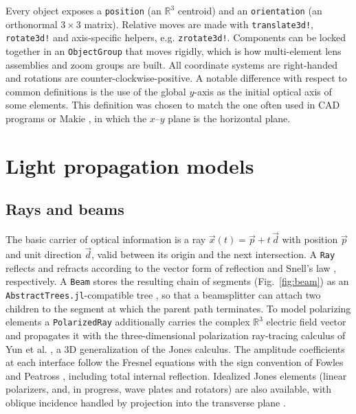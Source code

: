 \documentclass{juliacon}
\begin{document}
Every object exposes a \texttt{position} (an $\mathbb{R}^3$ centroid)
and an \texttt{orientation} (an orthonormal $3\times3$ matrix). Relative
moves are made with \texttt{translate3d!}, \texttt{rotate3d!} and 
axis-specific helpers, e.g. \texttt{zrotate3d!}. Components can be
locked together in an \texttt{ObjectGroup} that moves rigidly, which is
how multi-element lens assemblies and zoom groups are built. All
coordinate systems are right-handed and rotations are
counter-clockwise-positive. A notable difference with respect to common
definitions is the use of the global $y$-axis as the initial optical
axis of some elements. This definition was chosen to match the one often
used in CAD programs or Makie \cite{Danisch2021}, in which the $x$--$y$
plane is the horizontal plane.

\section{Light propagation models}

\subsection{Rays and beams}
\label{sec:rays}

The basic carrier of optical information is a ray
$\vec{x}(t) = \vec{p} + t\,\vec{d}$ with position $\vec{p}$ and unit
direction $\vec{d}$, valid between its origin and the next intersection.
A \texttt{Ray} reflects and refracts according to the vector form of
reflection and Snell's law \cite{Spencer1962}, respectively. A
\texttt{Beam} stores the resulting chain of segments
(Fig.~\ref{fig:beam}) as an \texttt{AbstractTrees.jl}-compatible tree
\cite{AbstractTrees}, so that a beamsplitter can attach two children to
the segment at which the parent path terminates. To model polarizing
elements a \texttt{PolarizedRay} additionally carries the complex
$\mathbb{R}^3$ electric field vector and propagates it with the
three-dimensional polarization ray-tracing calculus of Yun et al.
\cite{Yun2011_1, Yun2011_2}, a 3D generalization of the Jones calculus.
The amplitude coefficients at each interface follow the Fresnel
equations with the sign convention of Fowles \cite{Fowles1989} and
Peatross \cite{Peatross2015}, including total internal reflection.
Idealized Jones elements (linear polarizers, and, in progress, wave
plates and rotators) are also available, with oblique incidence handled
by projection into the transverse plane \cite{Korger2013}.
\end{document}
